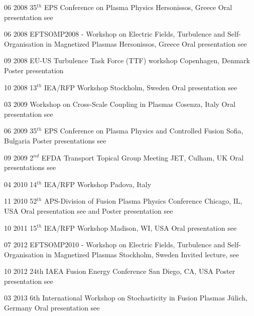 {\begin{entrylist}
\entry
{06 2008}
{35$^{th}$ EPS Conference on Plasma Physics} 
{Hersonissos, Greece} 
{Oral presentation see \cite{vianello:eps2008}}

\entry
{06 2008} 
{EFTSOMP2008 - Workshop on Electric Fields, Turbulence and Self-Organisation in Magnetized Plasmas} 
{Hersonissos, Greece} 
{Oral presentation see \cite{vianello:eftsomp08}}

\entry
{09 2008} 
{EU-US Turbulence Task Force (TTF) workshop}
{Copenhagen, Denmark} 
{Poster presentation}

\entry
{10 2008} 
{13$^{th}$ IEA/RFP Workshop} 
{Stockholm, Sweden} 
{Oral presentation see \cite{vianello:rfp08}}

\entry
{03 2009} 
{Workshop on Cross-Scale Coupling in Plasmas}
{Cosenza, Italy }
{Oral presentation see \cite{vianello:cross}}

\entry
{06 2009} 
{35$^{th}$ EPS Conference on Plasma Physics and
 Controlled Fusion} 
{Sofia, Bulgaria} 
{Poster presentations see \cite{vianello:eps2009-rfx,
    vianello:eps2009-asdex}}

\entry
{09 2009} 
{2$^{nd}$ EFDA Transport Topical Group Meeting} 
{JET, Culham, UK} 
{Oral presentations see \cite{vianello:efda09, vianello:efda09b}}

\entry
{04 2010}
{14$^{th}$ IEA/RFP Workshop} 
{Padova, Italy}
{}

\entry
{11 2010} 
{52$^{th}$ APS-Division of Fusion Plasma Physics Conference}
{Chicago, IL, USA}
{Oral presentation see \cite{vianello:dpp2010} and Poster presentation
see \cite{vianello:dpp2010b}}

\entry
{10 2011} 
{15$^{th}$ IEA/RFP Workshop} 
{Madison, WI,  USA}
{Oral presentation see \cite{vianello:rfp2011}}

\entry
{07 2012}
{EFTSOMP2010 - Workshop on Electric Fields, Turbulence and
  Self-Organisation in Magnetized Plasmas}
{Stockholm, Sweden}
{Invited lecture,  see \cite{vianello:eftsomp2012}}

\entry
{10 2012} 
{24th IAEA Fusion Energy Conference} 
{San Diego, CA, USA}
{Poster presentation see \cite{Vianello:2012uh}}

\entry
{03 2013}
{6th International Workshop on Stochasticity in Fusion Plasmas} 
{J{\"u}lich, Germany}
{Oral presentation see \cite{vianello:sfp2013}}



\end{entrylist}}
